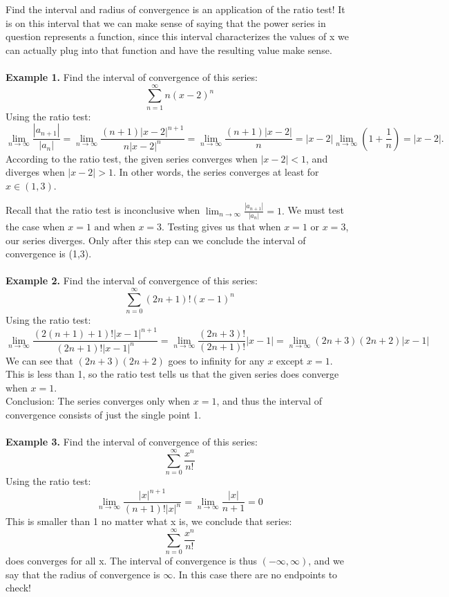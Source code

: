\documentclass{article}
\begin{document}
Find the interval and radius of convergence is an application of the ratio test! It is on this interval that we can make sense of saying that the power series in question represents a function, since this interval characterizes the values of x we can actually plug into that function and have the resulting value make sense. \\ \\ 
\textbf{Example 1. }Find the interval of convergence of this series: 
 $$ \sum_{n=1}^{\infty} n(x-2)^n$$
    Using the ratio test: 
    $$\lim_{n \to \infty} \frac{|a_{n+1}|}{|a_n|} = \lim_{n \to \infty} \frac{(n + 1)|x - 2|^{n+1}}{n|x - 2|^n} = \lim_{n \to \infty} \frac{(n + 1)|x - 2|}{n} = |x - 2| \lim_{n \to \infty} \left( 1 + \frac{1}{n} \right) = |x - 2|. $$
According to the ratio test, the given series converges when $|x-2| <  1$, and diverges when $|x-2| >1$. In other words, the series converges at least for $x \in (1,3).$ 

Recall that the ratio test is inconclusive when $\lim_{n\to\infty} \frac{|a_{n+1}|}{|a_n|} = 1.$ We must test the case when $x=1 \text{ and when } x = 3.$ Testing gives us that when $x=1 \text{ or } x=3$, our series diverges. Only after this step can we conclude the interval of convergence is (1,3). \\ \\ 
\textbf{Example 2. }Find the interval of convergence of this series: 
$$\sum_{n=0}^{\infty} (2n+1)!(x-1)^n$$
    Using the ratio test: 
    $$ \lim_{n\to\infty} \frac{(2(n+1)+1)! |x-1|^{n+1}}{(2n+1)!|x-1|^n} = \lim_{n\to\infty} \frac{(2n+3)!}{(2n+1)!} |x-1|= \lim_{n\to\infty} (2n+3)(2n+2)|x-1| $$
    We can see that $(2n+3)(2n+2)$ goes to infinity for any $x$ except $x=1$. This is less than 1, so the ratio test tells us that the given series does converge when $x=1. $  \\
    Conclusion: The series converges only when $x=1$, and thus the interval of convergence consists of just the single point 1. \\ \\
\textbf{Example 3. }Find the interval of convergence of this series:
$$ \sum_{n=0}^{\infty} \frac{x^n}{n!}$$
Using the ratio test:
$$ \lim_{n\to\infty} \frac{|x|^{n+1}}{(n+1)!|x|^n} = \lim_{n\to\infty} \frac{|x|}{n+1} = 0$$
This is smaller than 1 no matter what x is, we conclude that series: 
$$ \sum_{n=0}^{\infty} \frac{x^n}{n!}$$
does converges for all x. The interval of convergence is thus $(-\infty, \infty)$, and we say that the radius of convergence is $\infty$. In this case there are no endpoints to check! 
\end{document}
